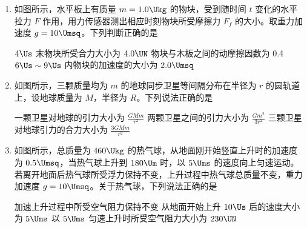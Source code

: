 \documentclass[\gkver]{gaokaozhenti}
\begin{document}
\begin{enumerate}

\item
如图所示，水平板上有质量 $m=1.0\Ukg$ 的物块，受到随时间 $t$ 变化的水平拉力 $F$ 作用，用力传感器测出相应时刻物块所受摩擦力 $F_{f}$ 的大小。取重力加速度 $g=10\Umsq$。下列判断正确的是


{$4\Us$ 末物块所受合力大小为 $4.0\UN$}
{物块与木板之间的动摩擦因数为 0.4}
{$6\Us\sim9\Us$ 内物块的加速度的大小为 $2.0\Umsq$}


\item
如图所示，三颗质量均为 $m$ 的地球同步卫星等间隔分布在半径为 $r$ 的圆轨道上，设地球质量为 $M$，半径为 $R$。下列说法正确的是


{一颗卫星对地球的引力大小为 $\frac{GMm}{r^{2}}$}
{两颗卫星之间的引力大小为 $\frac{Gm^{2}}{3r^{2}}$}
{三颗卫星对地球引力的合力大小为 $\frac{3GMm}{r^{2}}$}


\item
如图所示，总质量为 $460\Ukg$ 的热气球，从地面刚开始竖直上升时的加速度为 $0.5\Umsq$，当热气球上升到 $180\Um$ 时，以 $5\Ums$ 的速度向上匀速运动。若离开地面后热气球所受浮力保持不变，上升过程中热气球总质量不变，重力加速度 $g=10\Umsq$。关于热气球，下列说法正确的是


{加速上升过程中所受空气阻力保持不变}
{从地面开始上升 $10\Us$ 后的速度大小为 $5\Ums$}
{以 $5\Ums$ 匀速上升时所受空气阻力大小为 $230\UN$}


\end{enumerate}
\end{document}
